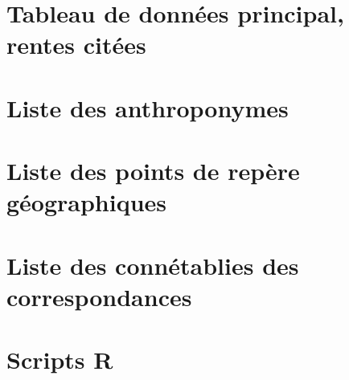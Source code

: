 \chapter{Tableau de données principal, rentes citées}

\chapter{Liste des anthroponymes}

\chapter{Liste des points de repère géographiques}

\chapter{Liste des connétablies des correspondances }

\chapter{Scripts R}









